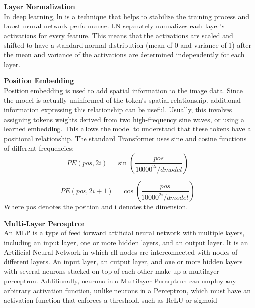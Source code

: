 \textbf{Layer Normalization}\\
In deep learning, \gls{ln} is a technique that helps to stabilize the
training process and boost neural network performance. LN separately normalizes each
layer's activations for every feature. This means that the activations are scaled and
shifted to have a standard normal distribution (mean of 0 and variance of 1) after the
mean and variance of the activations are determined independently for each layer.

\textbf{Position Embedding}\\
Position embedding is used to add spatial information to the image data. Since the
model is actually uninformed of the token's spatial relationship, additional information
expressing this relationship can be useful. Usually, this involves assigning tokens
weights derived from two high-frequency sine waves, or using a learned embedding.
This allows the model to understand that these tokens have a positional relationship.
The standard Transformer uses sine and cosine functions of different frequencies: 
\begin{equation}
PE(pos, 2i) = \sin(\frac{pos}{ 10000^{2i}/dmodel})
\end{equation}

\begin{equation}
PE(pos, 2i + 1) = \cos(\frac{pos}{10000^{2i}/dmodel})
\end{equation}
 Where pos denotes the position and i denotes the dimension.

\textbf{Multi-Layer Perceptron}\\
An MLP is a type of feed forward artificial neural network with multiple layers,
including an input layer, one or more hidden layers, and an output layer. It is an
Artificial Neural Network in which all nodes are interconnected with nodes of different
layers. An input layer, an output layer, and one or more hidden layers with several
neurons stacked on top of each other make up a multilayer perceptron. Additionally,
neurons in a Multilayer Perceptron can employ any arbitrary activation function, unlike neurons in a Perceptron, which must have an activation function that enforces a
threshold, such as ReLU or sigmoid


